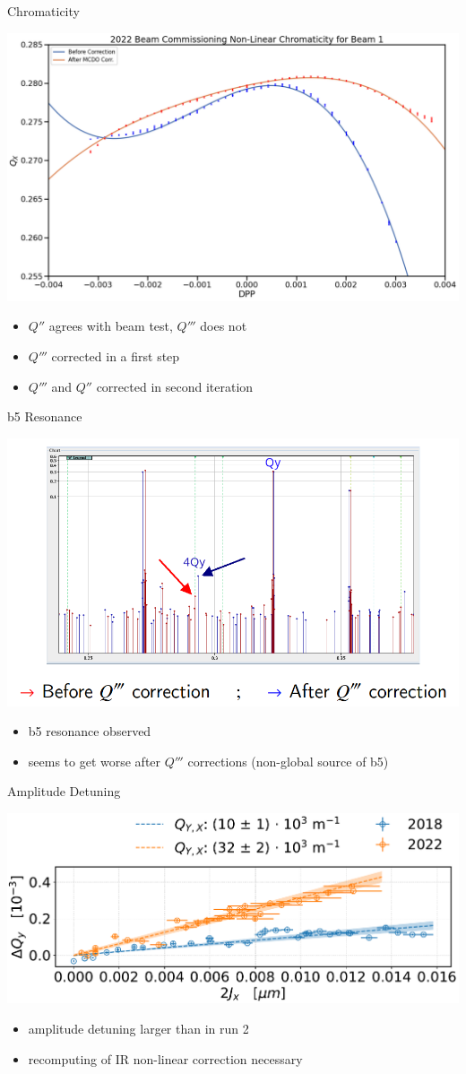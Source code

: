 \documentclass[4pt,usenames,dvipsnames,aspectratio=169]{beamer}
\begin{document}
\begin{frame}{Chromaticity}
    \begin{center}
        \includegraphics[width=0.49\linewidth]{images/nonlinear/comparison/qxb1q4.png}
    \end{center}
    \begin{itemize}
        \item $Q''$ agrees with beam test, $Q'''$ does not
        \item $Q'''$ corrected in a first step
        \item $Q'''$ and $Q''$ corrected in second iteration
    \end{itemize}
\end{frame}


\begin{frame}{b5 Resonance}
    \begin{center}
        \includegraphics[width=0.5\linewidth]{images/nonlinear/b5_preliminary.png}
    \end{center}
    \begin{itemize}
        \item b5 resonance observed
        \item seems to get worse after $Q'''$ corrections (non-global source of b5)
    \end{itemize}
\end{frame}


\begin{frame}{Amplitude Detuning}
    \begin{center}
        \includegraphics[width=0.5\linewidth]{images/nonlinear/comparison_2018_2022_dQYd2JX_corrected.pdf}
    \end{center}
    
    \begin{itemize}
        \item amplitude detuning larger than in run 2
        \item recomputing of IR non-linear correction necessary
    \end{itemize}
\end{frame}


\end{document}
